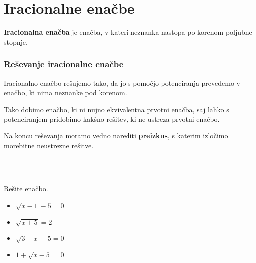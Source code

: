             \newpage

    \section{Iracionalne enačbe}

    
                \textbf{Iracionalna enačba} je enačba, v kateri neznanka nastopa po korenom poljubne stopnje.
            

            \subsubsection*{Reševanje iracionalne enačbe}
                Iracionalno enačbo rešujemo tako, da jo s pomočjo potenciranja prevedemo v enačbo, ki nima neznanke pod korenom.

                Tako dobimo enačbo, ki ni nujno ekvivalentna prvotni enačba, saj lahko s potenciranjem pridobimo kakšno rešitev, ki ne ustreza prvotni enačbo.

                Na koncu reševanja moramo vedno narediti \textbf{preizkus}, s katerim izločimo morebitne neustrezne rešitve.
            
        
~\\~\\


        
            \begin{naloga}
                Rešite enačbo.
                \begin{itemize}
                    \item $\displaystyle \sqrt{x-1}-5=0$ 
                    \item $\displaystyle \sqrt{x+5}=2$ 
                    \item $\displaystyle \sqrt{3-x}-5=0$ 
                    \item $\displaystyle 1+\sqrt{x-5}=0$ 
                \end{itemize}
            \end{naloga}

